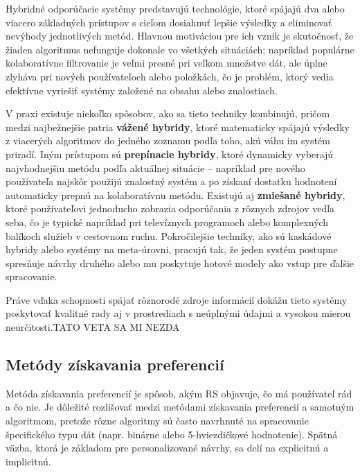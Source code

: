 Hybridné odporúčacie systémy predstavujú technológie, ktoré spájajú dva alebo viacero základných prístupov s cieľom dosiahnuť lepšie výsledky a eliminovať nevýhody jednotlivých metód.\cite{Jannach, Ricci} Hlavnou motiváciou pre ich vznik je skutočnosť, že žiaden algoritmus nefunguje dokonale vo všetkých situáciách; napríklad populárne kolaboratívne filtrovanie je veľmi presné pri veľkom množstve dát, ale úplne zlyháva pri nových používateľoch alebo položkách, čo je problém, ktorý vedia efektívne vyriešiť systémy založené na obsahu alebo znalostiach.\cite{Jannach, Ricci, Aggarwal} 

V praxi existuje niekoľko spôsobov, ako sa tieto techniky kombinujú, pričom medzi najbežnejšie patria \textbf{vážené hybridy}, ktoré matematicky spájajú výsledky z viacerých algoritmov do jedného zoznamu podľa toho, akú váhu im systém priradí.\cite{Burke, Aggarwal} Iným prístupom sú \textbf{prepínacie hybridy}, ktoré dynamicky vyberajú najvhodnejšiu metódu podľa aktuálnej situácie – napríklad pre nového používateľa najskôr použijú znalostný systém a po získaní dostatku hodnotení automaticky prepnú na kolaboratívnu metódu.\cite{Burke, Aggarwal} Existujú aj \textbf{zmiešané hybridy}, ktoré používateľovi jednoducho zobrazia odporúčania z rôznych zdrojov vedľa seba, čo je typické napríklad pri televíznych programoch alebo komplexných balíkoch služieb v cestovnom ruchu. Pokročilejšie techniky, ako sú kaskádové hybridy alebo systémy na meta-úrovni, pracujú tak, že jeden systém postupne spresňuje návrhy druhého alebo mu poskytuje hotové modely ako vstup pre ďalšie spracovanie.\cite{Burke, Aggarwal}

Práve vďaka schopnosti spájať rôznorodé zdroje informácií dokážu tieto systémy poskytovať kvalitné rady aj v prostrediach s neúplnými údajmi a vysokou mierou neurčitosti.TATO VETA SA MI NEZDA \cite{Jannach, Aggarwal}


\subsection{Metódy získavania preferencií}

Metóda získavania preferencií je spôsob, akým RS objavuje, čo má používateľ rád a čo nie. Je dôležité rozlišovať medzi metódami získavania preferencií a samotným algoritmom, pretože rôzne algoritmy sú často navrhnuté na spracovanie špecifického typu dát (napr. binárne alebo 5-hviezdičkové hodnotenie).\cite{Knij} Spätná väzba, ktorá je základom pre personalizované návrhy, sa delí na explicitnú a implicitnú. 

